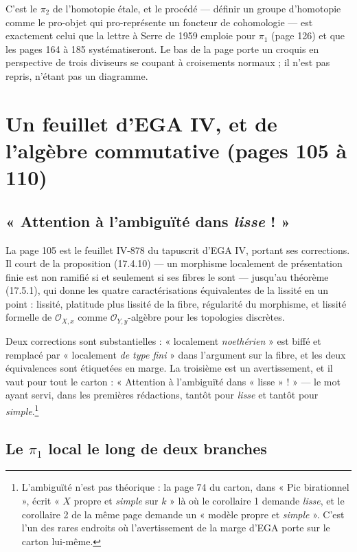 \documentclass[11pt,a4paper]{article}
\begin{document}
C'est le $\pi_{2}$ de l'homotopie étale, et le procédé --- définir un groupe
d'homotopie comme le pro-objet qui pro-représente un foncteur de cohomologie
--- est exactement celui que la lettre à Serre de 1959 emploie pour $\pi_{1}$
(page 126) et que les pages 164 à 185 systématiseront. Le bas de la page porte
un croquis en perspective de trois diviseurs se coupant à croisements normaux ;
il n'est pas repris, n'étant pas un diagramme.

\section*{Un feuillet d'EGA IV, et de l'algèbre commutative (pages 105 à 110)}

\subsection*{« Attention à l'ambiguïté dans \emph{lisse} ! »}

La page 105 est le feuillet IV-878 du tapuscrit d'EGA IV, portant ses
corrections. Il court de la proposition (17.4.10) --- un morphisme localement
de présentation finie est non ramifié si et seulement si ses fibres le sont ---
jusqu'au théorème (17.5.1), qui donne les quatre caractérisations équivalentes
de la lissité en un point : lissité, platitude plus lissité de la fibre,
régularité du morphisme, et lissité formelle de
$\mathcal{O}_{X,x}$ comme $\mathcal{O}_{Y,y}$-algèbre pour les topologies
discrètes.

Deux corrections sont substantielles : « localement \emph{noethérien} » est
biffé et remplacé par « localement \emph{de type fini} » dans l'argument sur la
fibre, et les deux équivalences sont étiquetées en marge. La troisième est un
avertissement, et il vaut pour tout le carton : « Attention à l'ambiguïté dans
« lisse » ! » --- le mot ayant servi, dans les premières rédactions, tantôt
pour \emph{lisse} et tantôt pour \emph{simple}.\footnote{L'ambiguïté n'est pas
théorique : la page 74 du carton, dans « Pic birationnel », écrit
« $X$ propre et \emph{simple} sur $k$ » là où le corollaire 1 demande
\emph{lisse}, et le corollaire 2 de la même page demande un « modèle propre et
\emph{simple} ». C'est l'un des rares endroits où l'avertissement de la marge
d'EGA porte sur le carton lui-même.}

\subsection*{Le $\pi_{1}$ local le long de deux branches}
\end{document}
